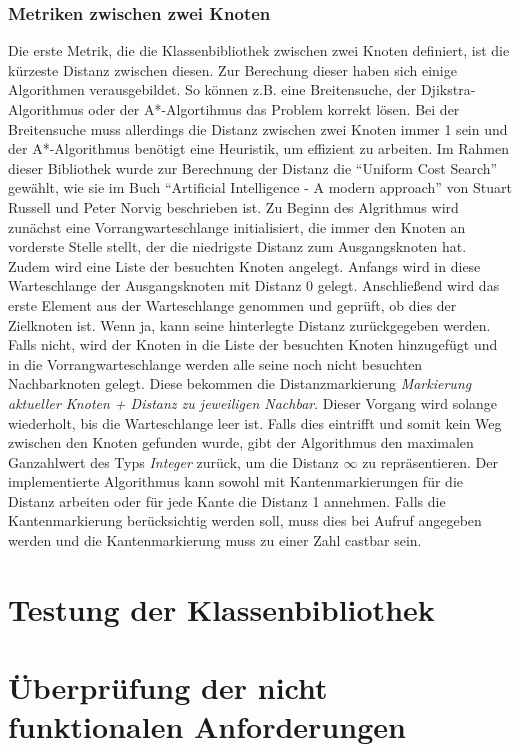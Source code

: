 \documentclass[a4paper,12pt,ngerman,chapterprefix=false,listof=totoc,bibliography=totoc]{scrreprt}
\begin{document}
{{\subsubsection*{Metriken zwischen zwei Knoten}
{
Die erste Metrik, die die Klassenbibliothek zwischen zwei Knoten definiert, ist die kürzeste Distanz zwischen diesen. Zur Berechung dieser haben sich einige Algorithmen verausgebildet. So können z.B. eine Breitensuche, der Djikstra-Algorithmus oder der A*-Algortihmus das Problem korrekt lösen. Bei der Breitensuche muss allerdings die Distanz zwischen zwei Knoten immer 1 sein und der A*-Algorithmus benötigt eine Heuristik, um effizient zu arbeiten. Im Rahmen dieser Bibliothek wurde zur Berechnung der Distanz die "`Uniform Cost Search"' gewählt, wie sie im Buch "`Artificial Intelligence - A modern approach"' von Stuart Russell und Peter Norvig beschrieben ist. Zu Beginn des Algrithmus wird zunächst eine Vorrangwarteschlange initialisiert, die immer den Knoten an vorderste Stelle stellt, der die niedrigste Distanz zum Ausgangsknoten hat. Zudem wird eine Liste der besuchten Knoten angelegt. Anfangs wird in diese Warteschlange der Ausgangsknoten mit Distanz 0 gelegt. Anschließend wird das erste Element aus der Warteschlange genommen und geprüft, ob dies der Zielknoten ist. Wenn ja, kann seine hinterlegte Distanz zurückgegeben werden. Falls nicht, wird der Knoten in die Liste der besuchten Knoten hinzugefügt und in die Vorrangwarteschlange werden alle seine noch nicht besuchten Nachbarknoten gelegt. Diese bekommen die Distanzmarkierung \textit{Markierung aktueller Knoten + Distanz zu jeweiligen Nachbar}. Dieser Vorgang wird solange wiederholt, bis die Warteschlange leer ist. Falls dies eintrifft und somit kein Weg zwischen den Knoten gefunden wurde, gibt der Algorithmus den maximalen Ganzahlwert des Typs \textit{Integer} zurück, um die Distanz \(\infty\) zu repräsentieren. Der implementierte Algorithmus kann sowohl mit Kantenmarkierungen für die Distanz arbeiten oder für jede Kante die Distanz 1 annehmen. Falls die Kantenmarkierung berücksichtig werden soll, muss dies bei Aufruf angegeben werden und die Kantenmarkierung muss zu einer Zahl castbar sein. \cite{russell_artificial_2016}
}
\section{Testung der Klassenbibliothek}

\section{Überprüfung der nicht funktionalen Anforderungen}

}}
\end{document}
